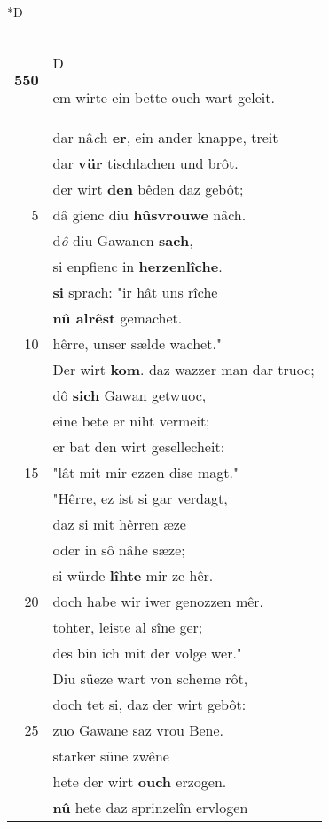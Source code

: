 \documentclass[8pt,a4paper,notitlepage]{article}
\begin{document}
\begin{table}[ht]
\begin{minipage}[t]{0.5\linewidth}
\small
\begin{center}*D
\end{center}
\begin{tabular}{rl}
\textbf{550} & \begin{large}D\end{large}em wirte ein bette ouch wart geleit.\\ 
 & dar nâ\textit{c}h \textbf{er}, ein ander knappe, treit\\ 
 & dar \textbf{vür} tischlachen und brôt.\\ 
 & der wirt \textbf{den} bêden daz gebôt;\\ 
5 & dâ gienc diu \textbf{hûsvrouwe} nâch.\\ 
 & d\textit{ô} diu Gawanen \textbf{sach},\\ 
 & si enpfienc in \textbf{herzenlîche}.\\ 
 & \textbf{si} sprach: "ir hât uns rîche\\ 
 & \textbf{nû alrêst} gemachet.\\ 
10 & hêrre, unser sælde wachet."\\ 
 & Der wirt \textbf{kom}. daz wazzer man dar truoc;\\ 
 & dô \textbf{sich} Gawan getwuoc,\\ 
 & eine bete er niht vermeit;\\ 
 & er bat den wirt gesellecheit:\\ 
15 & "lât mit mir ezzen dise magt."\\ 
 & "Hêrre, ez ist si gar verdagt,\\ 
 & daz si mit hêrren æze\\ 
 & oder in sô nâhe sæze;\\ 
 & si würde \textbf{lîhte} mir ze hêr.\\ 
20 & doch habe wir iwer genozzen mêr.\\ 
 & tohter, leiste al sîne ger;\\ 
 & des bin ich mit der volge wer."\\ 
 & Diu süeze wart von scheme rôt,\\ 
 & doch tet si, daz der wirt gebôt:\\ 
25 & zuo Gawane saz vrou Bene.\\ 
 & starker süne zwêne\\ 
 & hete der wirt \textbf{ouch} erzogen.\\ 
 & \textbf{nû} hete daz sprinzelîn ervlogen\\ 

\end{tabular}
\end{minipage}
\end{table}
\end{document}
